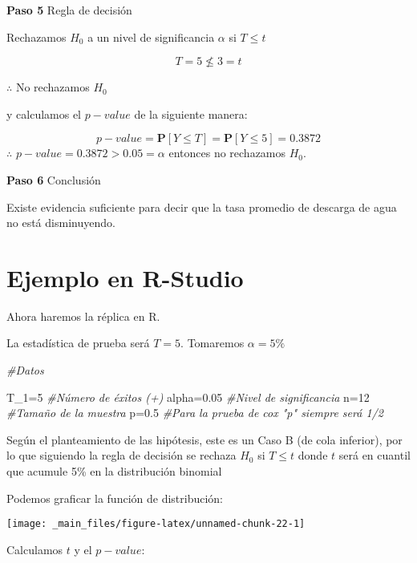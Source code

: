 \documentclass[
  a4paper,
  oneside,
  openany]{book}
\newenvironment{Shaded}{\begin{snugshade}}{\end{snugshade}}
\newcommand{\CommentTok}[1]{\textcolor[rgb]{0.56,0.35,0.01}{\textit{#1}}}
\newcommand{\DecValTok}[1]{\textcolor[rgb]{0.00,0.00,0.81}{#1}}
\newcommand{\FloatTok}[1]{\textcolor[rgb]{0.00,0.00,0.81}{#1}}
\newcommand{\NormalTok}[1]{#1}
\newcommand{\OtherTok}[1]{\textcolor[rgb]{0.56,0.35,0.01}{#1}}
\begin{document}
\textbf{Paso 5} Regla de decisión

Rechazamos \(H_0\) a un nivel de significancia \(\alpha\) si \(T \leq t\)

\[T=5 \nleq 3=t\]

\(\therefore\) No rechazamos \(H_0\)

y calculamos el \(p-value\) de la siguiente manera:

\[p-value=\mathbf{P}[Y\leq T]=\mathbf{P}[Y\leq 5]=0.3872\]
\(\therefore\) \(p-value=0.3872>0.05=\alpha\) entonces no rechazamos \(H_0\).

\textbf{Paso 6} Conclusión

Existe evidencia suficiente para decir que la tasa promedio de descarga de agua no está disminuyendo.

\hypertarget{ejemplo-en-r-studio-4}{%
\section{Ejemplo en R-Studio}\label{ejemplo-en-r-studio-4}}

Ahora haremos la réplica en R.

La estadística de prueba será \(T=5\). Tomaremos \(\alpha=5\%\)

\begin{Shaded}
\begin{Highlighting}[]
\CommentTok{\#Datos}

\NormalTok{T\_1}\OtherTok{=}\DecValTok{5}              \CommentTok{\#Número de éxitos (+)}
\NormalTok{alpha}\OtherTok{=}\FloatTok{0.05}       \CommentTok{\#Nivel de significancia}
\NormalTok{n}\OtherTok{=}\DecValTok{12}              \CommentTok{\#Tamaño de la muestra }
\NormalTok{p}\OtherTok{=}\FloatTok{0.5}            \CommentTok{\#Para la prueba de cox "p" siempre será 1/2}
\end{Highlighting}
\end{Shaded}

Según el planteamiento de las hipótesis, este es un Caso B (de cola inferior), por lo que siguiendo la regla de decisión se rechaza \(H_0\) si \(T\leq t\) donde \(t\) será en cuantil que acumule 5\% en la distribución binomial

Podemos graficar la función de distribución:

\begin{center}\texttt{[image: \_main\_files/figure-latex/unnamed-chunk-22-1]} \end{center}

Calculamos \(t\) y el \(p-value\):
\end{document}
